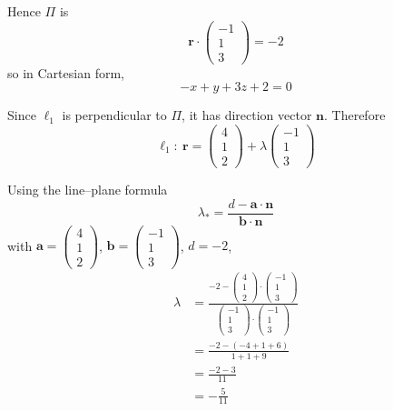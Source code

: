 \documentclass[leqno]{article}
\begin{document}
\begin{enumerate}[
  label=\textbf{\arabic*.},
  leftmargin=*,
  topsep=0pt,
  partopsep=0pt,
  parsep=0pt
]
\begin{tcolorbox}[colback=white, colframe=scarlet, title={\textbf{Solution}}, breakable, grow to left by=6mm, grow to right by=10mm]
\begin{enumerate}[label=\textbf{(\alph*)}]
Hence \(\Pi\) is
\[
\mathbf r\cdot \begin{pmatrix}-1\\1\\3\end{pmatrix}=-2
\]
so in Cartesian form,
\[
-x+y+3z+2=0
\]

Since \(\ell_1\) is perpendicular to \(\Pi\), it has direction vector \(\mathbf n\). Therefore
\[
\ell_1:\ \mathbf r=
\begin{pmatrix}4\\1\\2\end{pmatrix}
+\lambda
\begin{pmatrix}-1\\1\\3\end{pmatrix}
\]

Using the line--plane formula
\[
\lambda_*=\frac{d-\mathbf a\cdot\mathbf n}{\mathbf b\cdot\mathbf n}
\]
with \(\mathbf a=\begin{pmatrix}4\\1\\2\end{pmatrix}\), \(\mathbf b=\begin{pmatrix}-1\\1\\3\end{pmatrix}\), \(d=-2\),
\begin{align*}
\lambda
&=
\frac{-2-\begin{pmatrix}4\\1\\2\end{pmatrix}\cdot\begin{pmatrix}-1\\1\\3\end{pmatrix}}
{\begin{pmatrix}-1\\1\\3\end{pmatrix}\cdot\begin{pmatrix}-1\\1\\3\end{pmatrix}}\\
&=
\frac{-2-(-4+1+6)}{1+1+9}\\
&=
\frac{-2-3}{11}\\
&=
-\frac{5}{11}
\end{align*}


\end{enumerate}
\end{tcolorbox}
\end{enumerate}
\end{document}

